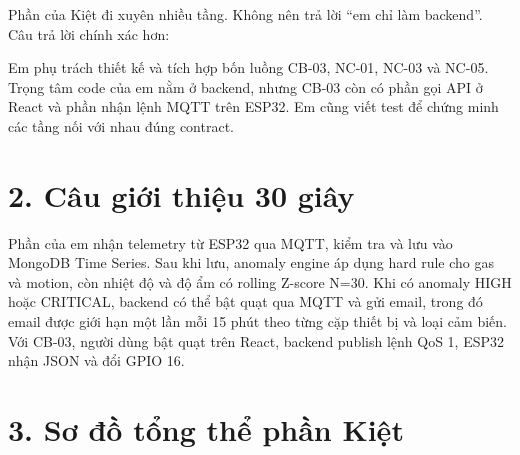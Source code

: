 \documentclass[11pt,oneside,openany]{book}
\renewenvironment{quote}{%
  \def\FrameCommand{\hspace{1pt}{\color{Accent}\vrule width 3pt}\hspace{9pt}}%
  \MakeFramed{\advance\hsize-\width\FrameRestore}%
  \color{MutedText}\itshape
}{\endMakeFramed}
\begin{document}
Phần của Kiệt đi xuyên nhiều tầng. Không nên trả lời ``em chỉ làm
backend''. Câu trả lời chính xác hơn:

\begin{quote}
Em phụ trách thiết kế và tích hợp bốn luồng CB-03, NC-01, NC-03 và
NC-05. Trọng tâm code của em nằm ở backend, nhưng CB-03 còn có phần gọi
API ở React và phần nhận lệnh MQTT trên ESP32. Em cũng viết test để
chứng minh các tầng nối với nhau đúng contract.
\end{quote}

\section{2. Câu giới thiệu 30
giây}\label{2-cuxe2u-giux1edbi-thiux1ec7u-30-giuxe2y}

\begin{quote}
Phần của em nhận telemetry từ ESP32 qua MQTT, kiểm tra và lưu vào
MongoDB Time Series. Sau khi lưu, anomaly engine áp dụng hard rule cho
gas và motion, còn nhiệt độ và độ ẩm có rolling Z-score N=30. Khi có
anomaly HIGH hoặc CRITICAL, backend có thể bật quạt qua MQTT và gửi
email, trong đó email được giới hạn một lần mỗi 15 phút theo từng cặp
thiết bị và loại cảm biến. Với CB-03, người dùng bật quạt trên React,
backend publish lệnh QoS 1, ESP32 nhận JSON và đổi GPIO 16.
\end{quote}

\section{3. Sơ đồ tổng thể phần
Kiệt}\label{3-sux1a1-ux111ux1ed3-tux1ed5ng-thux1ec3-phux1ea7n-kiux1ec7t}
\end{document}
